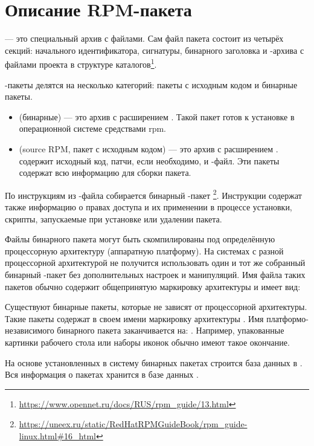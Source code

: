 \hypertarget{rpm-pack-desc}{\section{Описание RPM-пакета}}

 --- это специальный архив с файлами. Сам файл пакета состоит из четырёх секций:
начального идентификатора, сигнатуры, бинарного заголовка и -архива с файлами проекта в структуре
каталогов\footnote{\href{https://www.opennet.ru/docs/RUS/rpm_guide/13.html}{https://www.opennet.ru/docs/RUS/rpm\_guide/13.html}}.

-пакеты делятся на несколько категорий: пакеты с исходным кодом и бинарные пакеты.
\begin{itemize}
	\item {} (бинарные) --- это архив с расширением . Такой пакет готов к установке в
		операционной системе средствами rpm.
	\item {} (source RPM, пакет с исходным кодом) --- это архив с расширением .
		 содержит исходный код, патчи, если необходимо, и -файл. Эти пакеты содержат
		всю информацию для сборки пакета.
\end{itemize}

По инструкциям из -файла собирается бинарный -пакет%
\footnote{\href{https://uneex.ru/static/RedHatRPMGuideBook/rpm_guide-linux.html\#16_html}{https://uneex.ru/static/RedHatRPMGuideBook/rpm\_guide-linux.html\#16\_html}}. Инструкции содержат также информацию о правах доступа и их применении в
процессе установки, скрипты, запускаемые при установке или удалении пакета.

Файлы бинарного пакета могут быть скомпилированы под определённую процессорную архитектуру (аппаратную платформу).
На системах с разной процессорной архитектурой не получится использовать один и тот же
собранный бинарный -пакет без дополнительных настроек и манипуляций.
Имя файла таких пакетов обычно содержит общепринятую маркировку архитектуры и имеет вид:

Существуют бинарные пакеты, которые не зависят от процессорной архитектуры. Такие пакеты содержат
в своем имени маркировку архитектуры . Имя платформо-независимого бинарного пакета
заканчивается на: . Например, упакованные картинки рабочего стола или наборы иконок
обычно имеют такое окончание.

На основе установленных в систему бинарных пакетах строится база данных в . Вся
информация о пакетах хранится в базе данных .

